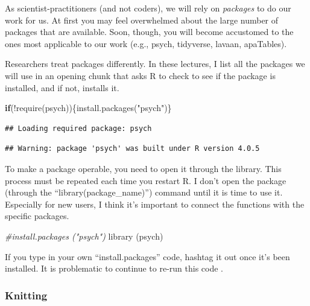\documentclass[
  english,
]{book}
\newenvironment{Shaded}{\begin{snugshade}}{\end{snugshade}}
\newcommand{\CommentTok}[1]{\textcolor[rgb]{0.56,0.35,0.01}{\textit{#1}}}
\newcommand{\ControlFlowTok}[1]{\textcolor[rgb]{0.13,0.29,0.53}{\textbf{#1}}}
\newcommand{\FunctionTok}[1]{\textcolor[rgb]{0.00,0.00,0.00}{#1}}
\newcommand{\NormalTok}[1]{#1}
\newcommand{\SpecialCharTok}[1]{\textcolor[rgb]{0.00,0.00,0.00}{#1}}
\newcommand{\StringTok}[1]{\textcolor[rgb]{0.31,0.60,0.02}{#1}}
\begin{document}
As scientist-practitioners (and not coders), we will rely on \emph{packages} to do our work for us. At first you may feel overwhelmed about the large number of packages that are available. Soon, though, you will become accustomed to the ones most applicable to our work (e.g., psych, tidyverse, lavaan, apaTables).

Researchers treat packages differently. In these lectures, I list all the packages we will use in an opening chunk that asks R to check to see if the package is installed, and if not, installs it.

\begin{Shaded}
\begin{Highlighting}[]
\ControlFlowTok{if}\NormalTok{(}\SpecialCharTok{!}\FunctionTok{require}\NormalTok{(psych))\{}\FunctionTok{install.packages}\NormalTok{(}\StringTok{"psych"}\NormalTok{)\}}
\end{Highlighting}
\end{Shaded}

\begin{verbatim}
## Loading required package: psych
\end{verbatim}

\begin{verbatim}
## Warning: package 'psych' was built under R version 4.0.5
\end{verbatim}

To make a package operable, you need to open it through the library. This process must be repeated each time you restart R. I don't open the package (through the ``library(package\_name)'') command until it is time to use it. Especially for new users, I think it's important to connect the functions with the specific packages.

\begin{Shaded}
\begin{Highlighting}[]
\CommentTok{\#install.packages ("psych")}
\FunctionTok{library}\NormalTok{ (psych)}
\end{Highlighting}
\end{Shaded}

If you type in your own ``install.packages'' code, hashtag it out once it's been installed. It is problematic to continue to re-run this code .

\hypertarget{knitting}{%
\subsubsection{Knitting}\label{knitting}}
\end{document}
